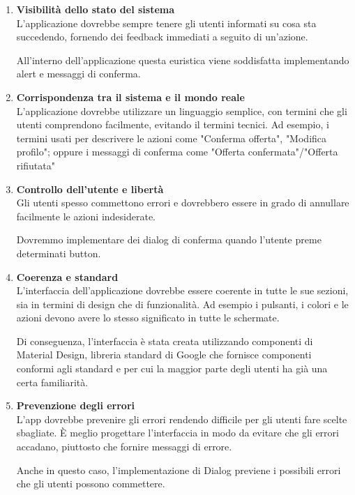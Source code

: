 \begin{enumerate}
	\item \textbf{\sffamily Visibilità dello stato del sistema} \\
	      L'applicazione dovrebbe sempre tenere gli utenti informati su cosa sta succedendo, fornendo dei feedback immediati a seguito di un'azione.

	      All'interno dell'applicazione questa euristica viene soddisfatta implementando alert e messaggi di conferma.

	\item \textbf{\sffamily Corrispondenza tra il sistema e il mondo reale} \\
	      L'applicazione dovrebbe utilizzare un linguaggio semplice, con termini che gli utenti comprendono facilmente, evitando il termini tecnici.
	      Ad esempio, i termini usati per descrivere le azioni come "Conferma offerta", "Modifica profilo"; oppure i messaggi di conferma come "Offerta confermata"/"Offerta rifiutata"

	\item \textbf{\sffamily Controllo dell'utente e libertà} \\
	      Gli utenti spesso commettono errori e dovrebbero essere in grado di annullare facilmente le azioni indesiderate.

	      Dovremmo implementare dei dialog di conferma quando l'utente preme determinati button.

	\item \textbf{\sffamily Coerenza e standard} \\
	      L'interfaccia dell'applicazione dovrebbe essere coerente in tutte le sue sezioni, sia in termini di design che di funzionalità.
	      Ad esempio i pulsanti, i colori e le azioni devono avere lo stesso significato in tutte le schermate.

	      Di conseguenza, l'interfaccia è stata creata utilizzando componenti di Material Design, libreria standard di Google che fornisce componenti conformi agli standard e per cui la maggior parte degli utenti ha già una certa familiarità.

	\item \textbf{\sffamily Prevenzione degli errori} \\
	      L'app dovrebbe prevenire gli errori rendendo difficile per gli utenti fare scelte sbagliate. È meglio progettare l'interfaccia in modo da evitare che gli errori accadano, piuttosto che fornire messaggi di errore.

	      Anche in questo caso, l'implementazione di Dialog previene i possibili errori che gli utenti possono commettere.


\end{enumerate}
